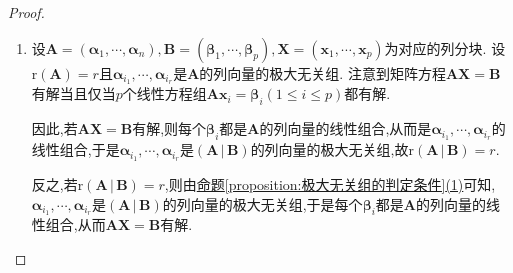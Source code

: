 \documentclass[../../main.tex]{subfiles}%
\begin{document}
\begin{proof}
\begin{enumerate}
\item 设\(\boldsymbol{A}=(\boldsymbol{\alpha}_1,\cdots,\boldsymbol{\alpha}_n),\boldsymbol{B}=(\boldsymbol{\beta}_1,\cdots,\boldsymbol{\beta}_p),\boldsymbol{X}=(\boldsymbol{x}_1,\cdots,\boldsymbol{x}_p)\)为对应的列分块. 设\(\mathrm{r}(\boldsymbol{A}) = r\)且\(\boldsymbol{\alpha}_{i_1},\cdots,\boldsymbol{\alpha}_{i_r}\)是\(\boldsymbol{A}\)的列向量的极大无关组. 注意到矩阵方程\(\boldsymbol{A}\boldsymbol{X}=\boldsymbol{B}\)有解当且仅当\(p\)个线性方程组\(\boldsymbol{A}\boldsymbol{x}_i=\boldsymbol{\beta}_i(1\leqslant  i\leqslant  p)\)都有解. 

因此,若\(\boldsymbol{A}\boldsymbol{X}=\boldsymbol{B}\)有解,则每个\(\boldsymbol{\beta}_i\)都是\(\boldsymbol{A}\)的列向量的线性组合,从而是\(\boldsymbol{\alpha}_{i_1},\cdots,\boldsymbol{\alpha}_{i_r}\)的线性组合,于是\(\boldsymbol{\alpha}_{i_1},\cdots,\boldsymbol{\alpha}_{i_r}\)是\(\left( \boldsymbol{A}\,|\,\boldsymbol{B} \right)\)的列向量的极大无关组,故\(\mathrm{r}\left( \boldsymbol{A}\,|\,\boldsymbol{B} \right) = r\). 

反之,若\(\mathrm{r}\left( \boldsymbol{A}\,|\,\boldsymbol{B} \right) = r\),则由\hyperref[proposition:极大无关组的判定条件]{命题\ref{proposition:极大无关组的判定条件}(1)}可知,\(\boldsymbol{\alpha}_{i_1},\cdots,\boldsymbol{\alpha}_{i_r}\)是\(\left( \boldsymbol{A}\,|\,\boldsymbol{B} \right)\)的列向量的极大无关组,于是每个\(\boldsymbol{\beta}_i\)都是\(\boldsymbol{A}\)的列向量的线性组合,从而\(\boldsymbol{A}\boldsymbol{X}=\boldsymbol{B}\)有解.


\end{enumerate}
\end{proof}
\end{document}

